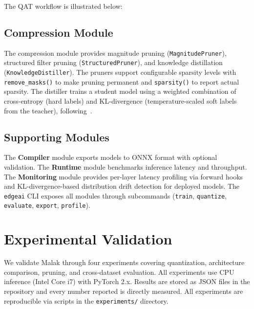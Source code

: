 \documentclass[10pt,twocolumn]{article}
\begin{document}
The QAT workflow is illustrated below:

\noindent{}

\subsection{Compression Module}

The compression module provides magnitude pruning (\texttt{MagnitudePruner}), structured filter pruning (\texttt{StructuredPruner}), and knowledge distillation (\texttt{KnowledgeDistiller}).
The pruners support configurable sparsity levels with \texttt{remove\_masks()} to make pruning permanent and \texttt{sparsity()} to report actual sparsity.
The distiller trains a student model using a weighted combination of cross-entropy (hard labels) and KL-divergence (temperature-scaled soft labels from the teacher), following~\cite{distillation}.

\subsection{Supporting Modules}

The \textbf{Compiler} module exports models to ONNX format with optional validation.
The \textbf{Runtime} module benchmarks inference latency and throughput.
The \textbf{Monitoring} module provides per-layer latency profiling via forward hooks and KL-divergence-based distribution drift detection for deployed models.
The \texttt{edgeai} CLI exposes all modules through subcommands (\texttt{train}, \texttt{quantize}, \texttt{evaluate}, \texttt{export}, \texttt{profile}).

\section{Experimental Validation}
\label{sec:experiments}

We validate Malak through four experiments covering quantization, architecture comparison, pruning, and cross-dataset evaluation.
All experiments use CPU inference (Intel Core i7) with PyTorch 2.x.
Results are stored as JSON files in the repository and every number reported is directly measured.
All experiments are reproducible via scripts in the \texttt{experiments/} directory.
\end{document}
